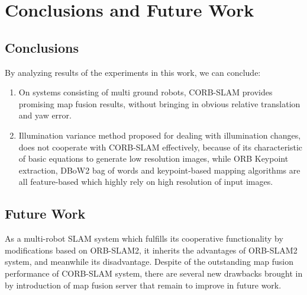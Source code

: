 
\chapter{Conclusions and Future Work}

\section{Conclusions}

By analyzing results of the experiments in this work, we can conclude:

\begin{enumerate}[1.]
	\item On systems consisting of multi ground robots, CORB-SLAM provides promising map fusion results, without bringing in obvious relative translation and yaw error.
	\item Illumination variance method proposed for dealing with illumination changes, does not cooperate with CORB-SLAM effectively, because of its characteristic of basic equations to generate low resolution images, while ORB Keypoint extraction, DBoW2 bag of words and keypoint-based mapping algorithms are all feature-based which highly rely on high resolution of input images.
\end{enumerate}

\section{Future Work}

As a multi-robot SLAM system which fulfills its cooperative functionality by modifications based on ORB-SLAM2, it inherits the advantages of ORB-SLAM2 system, and meanwhile its disadvantage. Despite of the outstanding map fusion performance of CORB-SLAM system, there are several new drawbacks brought in by introduction of map fusion server that remain to improve in future work. 

